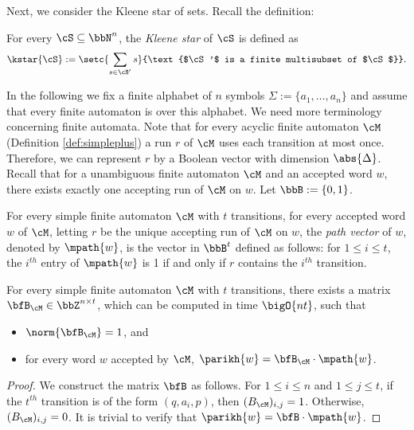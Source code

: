 Next, we consider the Kleene star of sets.
Recall the definition:

\medskip

For every $\cS \subseteq \bbN^n$,
the \emph{Kleene star} of $\cS$ is defined as
\begin{equation*}
    \kstar{\cS} := \setc{\sum_{s \in \cS'} s}{\text{$\cS'$ is a finite multisubset of $\cS$}}.
\end{equation*}

\medskip

In the following we fix a finite alphabet of $n$ symbols $\Sigma:=\{a_1,\ldots,a_n\}$
and assume that every finite automaton is over this alphabet.
We need more terminology concerning finite automata.
Note that for every acyclic finite automaton $\cM$ (Definition \ref{def:simpleplus})
a run $r$ of $\cM$ uses each transition at most once.
Therefore, we can represent $r$ by a Boolean vector with dimension $\abs{\Delta}$.
Recall that for a unambiguous finite automaton $\cM$ and an accepted word $w$, there exists exactly one accepting run of $\cM$ on $w$.
Let $\bbB:=\{0,1\}$.

\begin{definition}
    For every simple finite automaton $\cM$ with $t$ transitions,
    for every accepted word $w$ of $\cM$,
    letting $r$ be the unique accepting run of $\cM$ on $w$,
    the \emph{path vector} of $w$, denoted by $\mpath{w}$,
    is the vector in $\bbB^t$ defined as follows:
    for $1 \le i \le t$, the $i^{th}$ entry of $\mpath{w}$ is 1
    if and only if $r$ contains the $i^{th}$ transition.
\end{definition}

\begin{lemma}\label{lem:path}
For every simple finite automaton $\cM$ with $t$ transitions,
there exists a matrix $\bfB_\cM \in \bbZ^{n \times t}$,
which can be computed in time $\bigO{nt}$,
such that
\begin{itemize}
\item $\norm{\bfB_\cM} = 1$, and
\item for every word $w$ accepted by $\cM$, $\parikh{w} = \bfB_\cM\cdot\mpath{w}$.
\end{itemize}
\end{lemma}

\begin{proof}
    We construct the matrix $\bfB$ as follows.
    For $1 \le i \le n$ and $1 \le j \le t$,
    if the $t^{th}$ transition is of the form $(q, a_i, p)$,
    then $(B_\cM)_{i, j} = 1$.
    Otherwise, $(B_\cM)_{i, j} = 0$.
    It is trivial to verify that
    $\parikh{w} = \bfB\cdot\mpath{w}$.
\end{proof}


